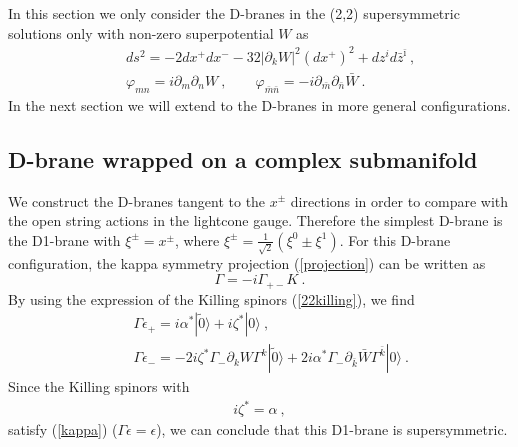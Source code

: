 \documentclass[a4paper,12pt]{article}
\numberwithin{equation}{section}
\newcommand{\del}{\partial}
\newcommand{\ib}{\bar{\imath}}
\newcommand{\kb}{\bar{k}}
\newcommand{\zb}{\bar{z}}
\newcommand{\vp}{\varphi}
\newcommand{\vac}{|0\rangle}
\newcommand{\vact}{|\tilde 0\rangle}
\newcommand{\nn}{\nonumber\\}
\begin{document}
In this section we only consider the D-branes in the
(2,2) supersymmetric solutions only with non-zero superpotential $W$ as
\begin{eqnarray}
 &&ds^2=-2dx^{+}dx^{-}-32|\del_k W|^2(dx^{+})^2 + dz^{i}d\zb^{\ib}~,\nn
 &&\vp_{mn}= i \del_m\del_n W~,\qquad 
   \vp_{\bar{m}\bar{n}}= -i \del_{\bar{m}} \del_{\bar{n}} \bar{W} ~.
\end{eqnarray}
In the next section we will extend to the D-branes in more general
configurations. 

\subsection{D-brane wrapped on a complex submanifold}

We construct the D-branes tangent to the $x^{\pm}$ directions in order
to compare with the open string actions in the lightcone gauge.  
Therefore the simplest D-brane is the D1-brane with $\xi^{\pm} = x^{\pm}$,
where $\xi^{\pm}=\frac{1}{\sqrt{2}}(\xi^0 \pm \xi^1)$.
For this D-brane configuration, the kappa symmetry projection 
(\ref{projection}) can be written as
\begin{equation}
 \Gamma= - i\Gamma_{+-} K ~.
\end{equation}
By using the expression of the Killing spinors (\ref{22killing}),
we find
\begin{eqnarray}
 &&\Gamma \epsilon_{+}=  i\alpha^* \vact + i\zeta^* \vac~,\nn
 &&\Gamma \epsilon_{-}=- 2 i \zeta^* \Gamma_{-} \del_{k} W \Gamma^{k} \vact
      + 2 i \alpha^* \Gamma_{-} \del_{\kb} \bar W \Gamma^{\kb}\vac~.
\end{eqnarray}
Since the Killing spinors with
\begin{eqnarray}
 i\zeta^*=\alpha~,
\label{D0cond}
\end{eqnarray}
satisfy (\ref{kappa}) ($\Gamma \epsilon = \epsilon$),
we can conclude that this D1-brane is supersymmetric.
\end{document}
